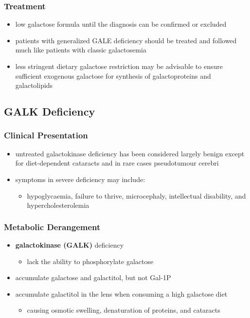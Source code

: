 \documentclass[12pt]{scrartcl}
\begin{document}
\subsubsection{Treatment}
\label{sec:orgffb52c6}
\begin{itemize}
\item low galactose formula until the diagnosis can be confirmed or excluded
\item patients with generalized GALE deficiency should be treated and
followed much like patients with classic galactosemia
\item less stringent dietary galactose restriction may be advisable to
ensure sufficient exogenous galactose for synthesis of
galactoproteins and galactolipids
\end{itemize}
\subsection{GALK Deficiency}
\label{sec:org4b62a60}
\subsubsection{Clinical Presentation}
\label{sec:orga5fcf3f}
\begin{itemize}
\item untreated galactokinase deficiency has been considered largely
benign except for diet-dependent cataracts and in rare cases pseudotumour cerebri
\item symptoms in severe deficiency may include:
\begin{itemize}
\item hypoglycaemia, failure to thrive, microcephaly, intellectual
disability, and hypercholesterolemia
\end{itemize}
\end{itemize}

\subsubsection{Metabolic Derangement}
\label{sec:orge87f4e5}
\begin{itemize}
\item \textbf{galactokinase (GALK)} deficiency
\begin{itemize}
\item lack the ability to phosphorylate galactose
\end{itemize}
\item accumulate galactose and galactitol, but not Gal-1P
\item accumulate galactitol in the lens when consuming a high galactose diet
\begin{itemize}
\item causing osmotic swelling, denaturation of proteins, and cataracts
\end{itemize}
\end{itemize}
\end{document}
